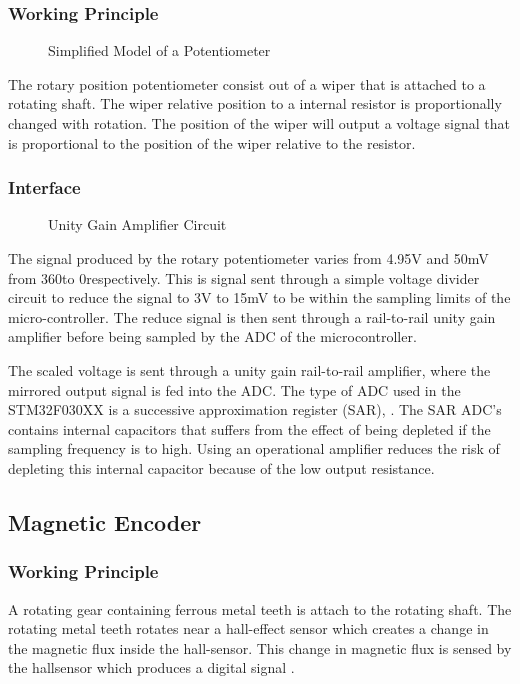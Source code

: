 \subsubsection{Working Principle}
\begin{figure}[h]
	\centering
	
	\caption{Simplified Model of a Potentiometer}
	\label{fig:potentiometer}
\end{figure}
The rotary position potentiometer consist out of a wiper that is attached to a rotating shaft. The wiper relative position to a internal resistor is proportionally changed with rotation. The position of the wiper will output a voltage signal that is proportional to the position of the wiper relative to the resistor. 

\subsubsection{Interface}
\begin{figure}[h]
	\centering
	
	\caption{Unity Gain Amplifier Circuit}
	\label{fig:unitygain}
\end{figure}
The signal produced by the rotary potentiometer varies from 4.95V and 50mV from 360\textdegree to 0\textdegree respectively. This is signal sent through a simple voltage divider circuit to reduce the signal to 3V to 15mV to be within the sampling limits of the micro-controller. The reduce signal is then sent through a rail-to-rail unity gain amplifier before being sampled by the ADC of the microcontroller.

The scaled voltage is sent through a unity gain rail-to-rail amplifier, where the mirrored output signal is fed into the ADC. The type of ADC used in the STM32F030XX is a successive approximation register (SAR), \citep{stm32_ADC:2017}. The SAR ADC's contains internal capacitors that suffers from the effect of being depleted if the sampling frequency is to high. Using an operational amplifier reduces the risk of depleting this internal capacitor because of the low output resistance.

\subsection{Magnetic Encoder}
\subsubsection{Working Principle}
A rotating gear containing ferrous metal teeth is attach to the rotating shaft. The rotating metal teeth rotates near a hall-effect sensor which creates a change in the magnetic flux inside the hall-sensor. This change in magnetic flux is sensed by the hallsensor which produces a digital signal \citep{hallsensor}.
